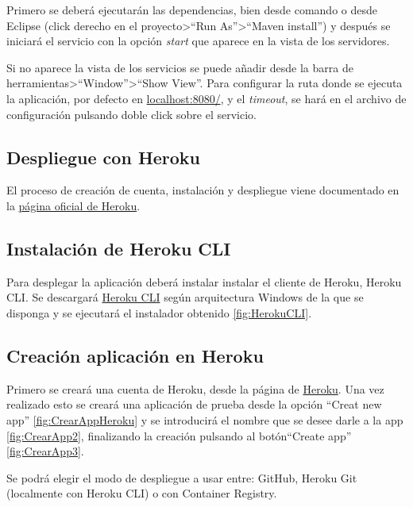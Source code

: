 Primero se deberá ejecutarán las dependencias, bien desde comando o desde Eclipse (click derecho en el proyecto>``Run As''>``Maven install'') y después se iniciará el servicio con la opción \emph{start} que aparece en la vista de los servidores. 

Si no aparece la vista de los servicios se puede añadir desde la barra de herramientas>``Window''>``Show View''. Para configurar la ruta donde se ejecuta la aplicación, por defecto en \href{http://localhost:8080/}{localhost:8080/}, y el \emph{timeout}, se hará en el archivo de configuración pulsando doble click sobre el servicio.

\subsection{Despliegue con Heroku}
El proceso de creación de cuenta, instalación y despliegue viene documentado en la \href{https://devcenter.heroku.com/articles/getting-started-with-java}{página oficial de Heroku}.

\subsection{Instalación de Heroku CLI}
Para desplegar la aplicación deberá instalar instalar el cliente de Heroku, Heroku CLI. Se descargará \href{https://devcenter.heroku.com/articles/heroku-cli#download-and-install}{Heroku CLI} según arquitectura Windows de la que se disponga y se ejecutará el instalador obtenido \ref{fig:HerokuCLI}.


\subsection{Creación aplicación en Heroku}
Primero se creará una cuenta de Heroku, desde la página de \href{https://dashboard.heroku.com/}{Heroku}. Una vez realizado esto se creará una aplicación de prueba desde la opción ``Creat new app'' \ref{fig:CrearAppHeroku} y se introducirá el nombre que se desee darle a la app \ref{fig:CrearApp2}, finalizando la creación pulsando al botón``Create app'' \ref{fig:CrearApp3}. 


Se podrá elegir el modo de despliegue a usar entre: GitHub, Heroku Git (localmente con Heroku CLI) o con Container Registry.

